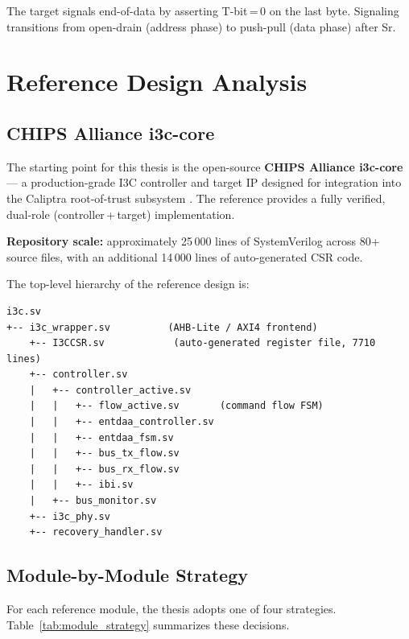 \documentclass[12pt, a4paper, oneside]{report}
\begin{document}
The target signals end-of-data by asserting T-bit\,=\,0 on the last byte. Signaling
transitions from open-drain (address phase) to push-pull (data phase) after Sr.

\chapter{Reference Design Analysis}

\section{CHIPS Alliance i3c-core}

The starting point for this thesis is the open-source \textbf{CHIPS Alliance i3c-core}
--- a production-grade I3C controller and target IP designed for integration into the
Caliptra root-of-trust subsystem \cite{chipsalliance_i3c}. The reference provides a
fully verified, dual-role (controller\,+\,target) implementation.

\textbf{Repository scale:} approximately 25\,000 lines of SystemVerilog across 80+
source files, with an additional 14\,000 lines of auto-generated CSR code.

The top-level hierarchy of the reference design is:

\begin{lstlisting}[style=plain, caption={CHIPS Alliance i3c-core top-level hierarchy}]
i3c.sv
+-- i3c_wrapper.sv          (AHB-Lite / AXI4 frontend)
    +-- I3CCSR.sv            (auto-generated register file, 7710 lines)
    +-- controller.sv
    |   +-- controller_active.sv
    |   |   +-- flow_active.sv       (command flow FSM)
    |   |   +-- entdaa_controller.sv
    |   |   +-- entdaa_fsm.sv
    |   |   +-- bus_tx_flow.sv
    |   |   +-- bus_rx_flow.sv
    |   |   +-- ibi.sv
    |   +-- bus_monitor.sv
    +-- i3c_phy.sv
    +-- recovery_handler.sv
\end{lstlisting}

\section{Module-by-Module Strategy}

For each reference module, the thesis adopts one of four strategies.
Table~\ref{tab:module_strategy} summarizes these decisions.
\end{document}
